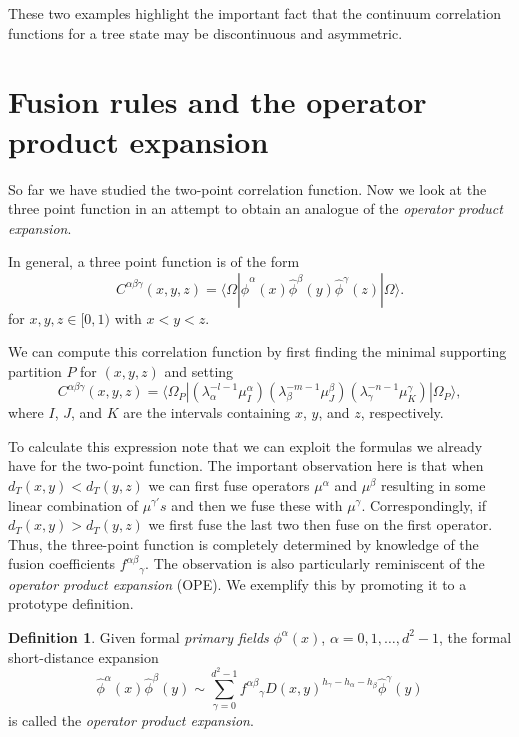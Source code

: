 \documentclass[11pt,oneside]{amsart}
\theoremstyle{plain}%
\theoremstyle{definition}
\newtheorem{definition}{Definition}[section]
\theoremstyle{remark}
\begin{document}
These two examples highlight the important fact that the continuum correlation functions for a tree state may be discontinuous and asymmetric.

\section{Fusion rules and the operator product expansion}\label{sec:ope}
So far we have studied the two-point correlation function. Now we look at the three point function in an attempt to obtain an analogue of the \emph{operator product expansion}.

In general, a three point function is of the form
\begin{equation}
	C^{\alpha\beta\gamma}(x,y,z) = \langle\Omega|\hat{\phi}^{\alpha}(x)\hat{\phi}^{\beta}(y)\hat{\phi}^{\gamma}(z)|\Omega\rangle.
\end{equation}
for $x,y,z\in[0,1)$ with $x<y<z$.

We can compute this correlation function by first finding the minimal supporting partition $P$ for $(x,y,z)$ and setting
\begin{equation}
	C^{\alpha\beta\gamma}(x,y,z) = \langle\Omega_P|(\lambda_{\alpha}^{-l-1}\mu^{\alpha}_I)(\lambda_{\beta}^{-m-1}\mu^{\beta}_J)(\lambda_{\gamma}^{-n-1}\mu^{\gamma}_K)|\Omega_P\rangle,
\end{equation}
where $I$, $J$, and $K$ are the intervals containing $x$, $y$, and $z$, respectively.

To calculate this expression note that we can exploit the formulas we already have for the two-point function. The important observation here is that when $d_T(x,y) < d_T(y,z)$ we can first fuse operators $\mu^{\alpha}$ and $\mu^{\beta}$ resulting in some linear combination of $\mu^{\gamma'}s$ and then we fuse these with $\mu^\gamma$. Correspondingly, if $d_T(x,y) > d_T(y,z)$ we first fuse the last two then fuse on the first operator. Thus, the three-point function is completely determined by knowledge of the fusion coefficients ${f^{\alpha\beta}}_\gamma$. The observation is also particularly reminiscent of the \emph{operator product expansion} (OPE). We exemplify this by promoting it to a prototype definition.
\begin{definition}
	Given formal \emph{primary fields} $\phi^\alpha(x)$, $\alpha = 0, 1, \ldots, d^2-1$, the formal short-distance expansion
	\begin{equation}
		  \hat{\phi}^\alpha(x)\hat{\phi}^\beta(y) \sim \sum_{\gamma=0}^{d^2-1} {f^{\alpha\beta}}_{\gamma}D(x,y)^{h_\gamma-h_\alpha-h_\beta} \hat{\phi}^\gamma(y)
	\end{equation}
	is called the \emph{operator product expansion}.
\end{definition}
\end{document}
